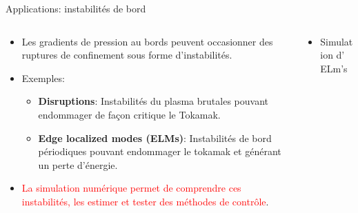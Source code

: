 \begin{frame}{Applications: instabilit\'es de bord}
\small
\begin{columns}
\begin{column}{6.5cm}
\begin{itemize}
\item Les gradients  de pression au bords peuvent occasionner des ruptures de confinement sous forme d'instabilit\'es.
\item Exemples: 
\begin{itemize}
\item \textbf{Disruptions}: Instabilit\'es du plasma brutales pouvant endommager de fa\c{c}on critique le Tokamak.
\item \textbf{Edge localized modes (ELMs)}: Instabilit\'es de bord p\'eriodiques  pouvant endommager le tokamak et g\'en\'erant un perte d'\'energie.
\end{itemize}
\vspace{1mm}
\item \textcolor{red}{La simulation num\'erique permet de comprendre ces instabilit\'es, les estimer et tester des m\'ethodes de contr\^{o}le}. 
\end{itemize}
\end{column}
\begin{column}{7.5cm}
\begin{itemize}
\item Simulation d' ELm's 
\end{itemize}
\end{column}
\end{columns}
\end{frame} 

